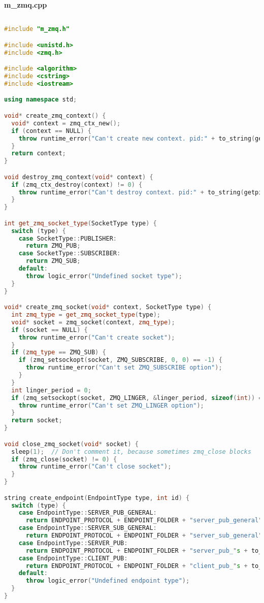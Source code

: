 \textbf{m\_zmq.cpp}

\begin{lstlisting}[language=C++]

#include "m_zmq.h"

#include <unistd.h>
#include <zmq.h>

#include <algorithm>
#include <cstring>
#include <iostream>

using namespace std;

void* create_zmq_context() {
  void* context = zmq_ctx_new();
  if (context == NULL) {
    throw runtime_error("Can't create new context. pid:" + to_string(getpid()));
  }
  return context;
}

void destroy_zmq_context(void* context) {
  if (zmq_ctx_destroy(context) != 0) {
    throw runtime_error("Can't destroy context. pid:" + to_string(getpid()));
  }
}

int get_zmq_socket_type(SocketType type) {
  switch (type) {
    case SocketType::PUBLISHER:
      return ZMQ_PUB;
    case SocketType::SUBSCRIBER:
      return ZMQ_SUB;
    default:
      throw logic_error("Undefined socket type");
  }
}

void* create_zmq_socket(void* context, SocketType type) {
  int zmq_type = get_zmq_socket_type(type);
  void* socket = zmq_socket(context, zmq_type);
  if (socket == NULL) {
    throw runtime_error("Can't create socket");
  }
  if (zmq_type == ZMQ_SUB) {
    if (zmq_setsockopt(socket, ZMQ_SUBSCRIBE, 0, 0) == -1) {
      throw runtime_error("Can't set ZMQ_SUBSCRIBE option");
    }
  }
  int linger_period = 0;
  if (zmq_setsockopt(socket, ZMQ_LINGER, &linger_period, sizeof(int)) == -1) {
    throw runtime_error("Can't set ZMQ_LINGER option");
  }
  return socket;
}

void close_zmq_socket(void* socket) {
  sleep(1);  // Don't comment it, because sometimes zmq_close blocks
  if (zmq_close(socket) != 0) {
    throw runtime_error("Can't close socket");
  }
}

string create_endpoint(EndpointType type, int id) {
  switch (type) {
    case EndpointType::SERVER_PUB_GENERAL:
      return ENDPOINT_PROTOCOL + ENDPOINT_FOLDER + "server_pub_general"s;
    case EndpointType::SERVER_SUB_GENERAL:
      return ENDPOINT_PROTOCOL + ENDPOINT_FOLDER + "server_sub_general"s;
    case EndpointType::SERVER_PUB:
      return ENDPOINT_PROTOCOL + ENDPOINT_FOLDER + "server_pub_"s + to_string(id);
    case EndpointType::CLIENT_PUB:
      return ENDPOINT_PROTOCOL + ENDPOINT_FOLDER + "client_pub_"s + to_string(id);
    default:
      throw logic_error("Undefined endpoint type");
  }
}


\end{lstlisting}
